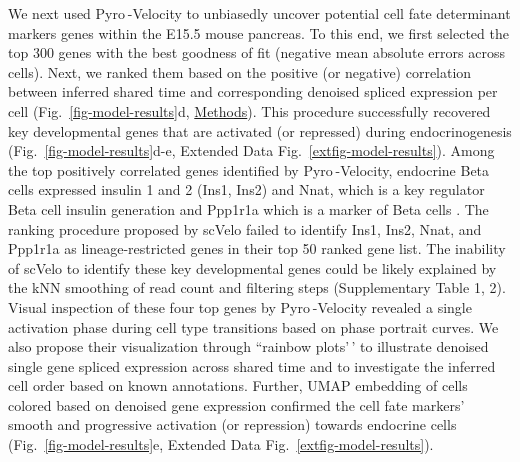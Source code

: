 \documentclass[
  sn-mathphys-num,
  lineno,
  twocolumn]{sn-jnl}
\begin{document}
We next used Pyro -Velocity to unbiasedly uncover potential cell fate
determinant markers genes within the E15.5 mouse pancreas. To this end,
we first selected the top 300 genes with the best goodness of fit
(negative mean absolute errors across cells). Next, we ranked them based
on the positive (or negative) correlation between inferred shared time
and corresponding denoised spliced expression per cell
(Fig.~\ref{fig-model-results}d, \hyperref[sec-methods]{Methods}). This
procedure successfully recovered key developmental genes that are
activated (or repressed) during endocrinogenesis
(Fig.~\ref{fig-model-results}d-e,
Extended Data Fig.~\ref{extfig-model-results}). Among the top positively
correlated genes identified by Pyro -Velocity, endocrine Beta cells
expressed insulin 1 and 2 (Ins1, Ins2) and Nnat, which is a key
regulator Beta cell insulin generation \citep{Millership2018-vd} and
Ppp1r1a which is a marker of Beta cells \citep{Jiang2013-pt}. The
ranking procedure proposed by scVelo failed to identify Ins1, Ins2,
Nnat, and Ppp1r1a as lineage-restricted genes in their top 50 ranked
gene list. The inability of scVelo to identify these key developmental
genes could be likely explained by the kNN smoothing of read count and
filtering steps (Supplementary Table 1, 2). Visual inspection of these
four top genes by Pyro -Velocity revealed a single activation phase
during cell type transitions based on phase portrait curves. We also
propose their visualization through ``rainbow plots'\,' to illustrate
denoised single gene spliced expression across shared time and to
investigate the inferred cell order based on known annotations. Further,
UMAP embedding of cells colored based on denoised gene expression
confirmed the cell fate markers' smooth and progressive activation (or
repression) towards endocrine cells (Fig.~\ref{fig-model-results}e,
Extended Data Fig.~\ref{extfig-model-results}).
\end{document}
